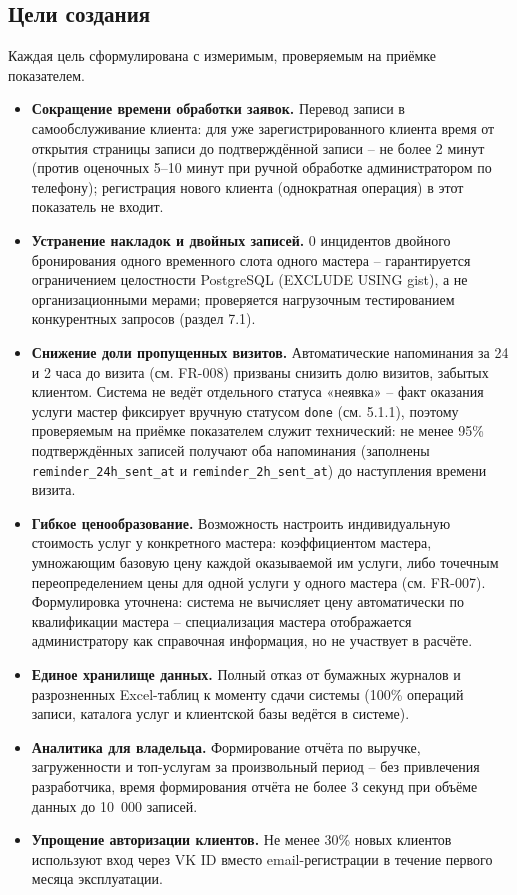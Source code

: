 \subsection{Цели создания}

Каждая цель сформулирована с измеримым, проверяемым на приёмке показателем.

\begin{itemize}
  \item \textbf{Сокращение времени обработки заявок.} Перевод записи в самообслуживание клиента: для уже зарегистрированного клиента время от открытия страницы записи до подтверждённой записи -- не более 2 минут (против оценочных 5--10 минут при ручной обработке администратором по телефону); регистрация нового клиента (однократная операция) в этот показатель не входит.
  \item \textbf{Устранение накладок и двойных записей.} 0 инцидентов двойного бронирования одного временного слота одного мастера -- гарантируется ограничением целостности PostgreSQL (EXCLUDE USING gist), а не организационными мерами; проверяется нагрузочным тестированием конкурентных запросов (раздел 7.1).
  \item \textbf{Снижение доли пропущенных визитов.} Автоматические напоминания за 24 и 2 часа до визита (см. FR-008) призваны снизить долю визитов, забытых клиентом. Система не ведёт отдельного статуса «неявка» -- факт оказания услуги мастер фиксирует вручную статусом \texttt{done} (см. 5.1.1), поэтому проверяемым на приёмке показателем служит технический: не менее 95\% подтверждённых записей получают оба напоминания (заполнены \texttt{reminder\_24h\_sent\_at} и \texttt{reminder\_2h\_sent\_at}) до наступления времени визита.
  \item \textbf{Гибкое ценообразование.} Возможность настроить индивидуальную стоимость услуг у конкретного мастера: коэффициентом мастера, умножающим базовую цену каждой оказываемой им услуги, либо точечным переопределением цены для одной услуги у одного мастера (см. FR-007). Формулировка уточнена: система не вычисляет цену автоматически по квалификации мастера -- специализация мастера отображается администратору как справочная информация, но не участвует в расчёте.
  \item \textbf{Единое хранилище данных.} Полный отказ от бумажных журналов и разрозненных Excel-таблиц к моменту сдачи системы (100\% операций записи, каталога услуг и клиентской базы ведётся в системе).
  \item \textbf{Аналитика для владельца.} Формирование отчёта по выручке, загруженности и топ-услугам за произвольный период -- без привлечения разработчика, время формирования отчёта не более 3 секунд при объёме данных до 10~000 записей.
  \item \textbf{Упрощение авторизации клиентов.} Не менее 30\% новых клиентов используют вход через VK ID вместо email-регистрации в течение первого месяца эксплуатации.
\end{itemize}

